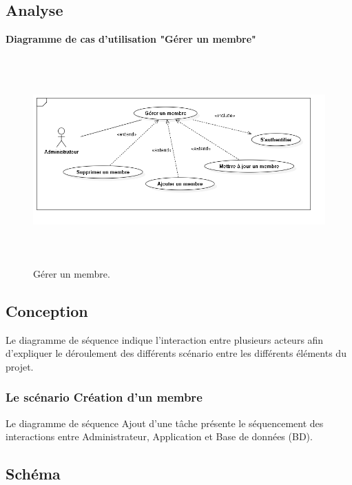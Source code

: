 

\subsection{Analyse}

    \textbf{ Diagramme de cas d'utilisation "G\'{e}rer un membre"}
    \begin{figure}[H]
    \center
    \includegraphics[width=13cm,height=8cm]{./figures/ucM.png}
    \caption{G\'{e}rer un membre.}

    \end{figure}

\subsection{Conception}

Le diagramme de s\'{e}quence indique l'interaction entre plusieurs acteurs
afin d'expliquer le d\'{e}roulement des diff\'{e}rents sc\'{e}nario entre les diff\'{e}rents
\'{e}l\'{e}ments du projet.

\subsubsection{Le sc\'{e}nario \guillemotleft{} Cr\'{e}ation d'un membre \guillemotright{}}

Le diagramme de s\'{e}quence \guillemotleft{} Ajout d'une t\^{a}che \guillemotright{} pr\'{e}sente le s\'{e}quencement
des interactions entre Administrateur, Application et Base de donn\'{e}es (BD).


\subsection{Sch\'{e}ma}

